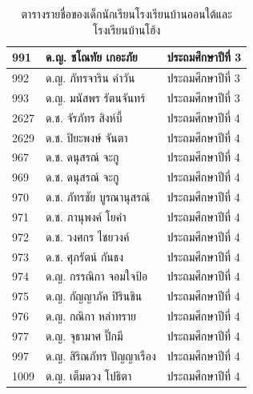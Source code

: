 \begin{table}[h]
\begin{center}
\begin{tabular}{ |p{3cm}|p{4cm}|p{3cm}| }
            \hline
            991 & ด.ญ. ชโณทัย เกอะภัย & ประถมศึกษาปีที่ 3\\
            \hline
            992 & ด.ญ. ภัทรจาริน คำวัน & ประถมศึกษาปีที่ 3\\
            \hline
            993 & ด.ญ. มนัสพร รัตนจันทร์ & ประถมศึกษาปีที่ 3\\
            \hline
            2627 & ด.ช. จัรภัทร สิงห์บี้ & ประถมศึกษาปีที่ 4\\
            \hline
            2629 & ด.ช. ปิยะพงษ์ จันตา & ประถมศึกษาปีที่ 4\\
            \hline
            967 & ด.ช. ดนุสรณ์ จะกู & ประถมศึกษาปีที่ 4\\
            \hline
            969 & ด.ช. ดนุสรณ์ จะกู & ประถมศึกษาปีที่ 4\\
            \hline
            970 & ด.ช. ภัทรชัย บูรณานุสรณ์ & ประถมศึกษาปีที่ 4\\
            \hline
            971 & ด.ช. ภานุพงค์ โยคำ & ประถมศึกษาปีที่ 4\\
            \hline
            972 & ด.ช. วงศกร ไชยวงค์ & ประถมศึกษาปีที่ 4\\
            \hline
            973 & ด.ช. ศุภรัตน์ กันธง & ประถมศึกษาปีที่ 4\\
            \hline
            974 & ด.ญ. กรรณิกา จอมใจป้อ & ประถมศึกษาปีที่ 4\\
            \hline
            975 & ด.ญ. กัญญาภัค ปิรินชิน & ประถมศึกษาปีที่ 4\\
            \hline
            976 & ด.ญ. กณิกา หลำทราย & ประถมศึกษาปีที่ 4\\
            \hline
            977 & ด.ญ. จุธามาศ ปิ๊กมี & ประถมศึกษาปีที่ 4\\
            \hline
            997 & ด.ญ. สิริณภัทร ปัญญาเรือง & ประถมศึกษาปีที่ 4\\
            \hline
            1009 & ด.ญ. เต็มดวง โปธิตา & ประถมศึกษาปีที่ 4\\
            \hline
        \end{tabular}
    \end{center}
    \caption[ตารางรายชื่อของเด็กนักเรียนโรงเรียนบ้านออนใต้และโรงเรียนบ้านโฮ้ง]{ตารางรายชื่อของเด็กนักเรียนโรงเรียนบ้านออนใต้และโรงเรียนบ้านโฮ้ง}
    \label{studentstable}
\end{table}
